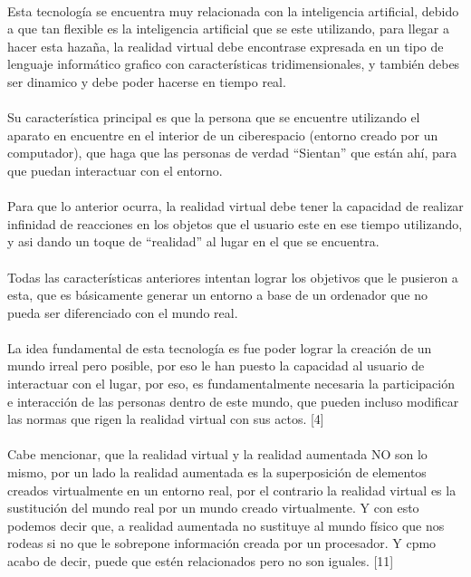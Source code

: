 \documentclass{bmcart}
\begin{document}
\paragraph{}
Esta tecnología se encuentra muy relacionada con la inteligencia artificial, debido a que tan flexible es la inteligencia artificial que se este utilizando, para llegar a hacer esta hazaña, la realidad virtual debe encontrase expresada en un tipo de lenguaje informático grafico con características tridimensionales, y también debes ser dinamico y debe poder hacerse en tiempo real.
\paragraph{}
Su característica principal es que la persona que se encuentre utilizando el aparato en encuentre en el interior de un ciberespacio (entorno creado por un computador), que haga que las personas de verdad “Sientan”  que están ahí, para que puedan interactuar con el entorno.
\paragraph{}
Para que lo anterior ocurra, la realidad virtual debe tener la capacidad de realizar infinidad de reacciones en los objetos que el usuario este en ese tiempo utilizando, y asi dando un toque de “realidad” al lugar en el que se encuentra.
\paragraph{}
Todas las características anteriores intentan lograr los objetivos que le pusieron a esta, que es básicamente generar un entorno a base de un ordenador que no pueda ser diferenciado con el mundo real.
\paragraph{}
La idea fundamental de esta tecnología es  fue poder lograr la creación de un mundo irreal pero posible, por eso le han puesto la capacidad al usuario de interactuar con el lugar, por eso, es fundamentalmente necesaria la participación e interacción de las personas dentro de este mundo, que pueden incluso modificar las normas que rigen la realidad virtual con sus actos. [4]
\paragraph{}
Cabe mencionar, que la realidad virtual y la realidad aumentada NO son lo mismo, por un lado la realidad aumentada es la superposición de elementos creados virtualmente en un entorno real, por el contrario la realidad virtual es la sustitución del mundo real por un mundo creado virtualmente. Y con esto podemos decir que, a realidad aumentada no sustituye al mundo físico que nos rodeas si no que le sobrepone información creada por un procesador. Y cpmo acabo de decir, puede que estén relacionados pero no son iguales. [11]
\end{document}
